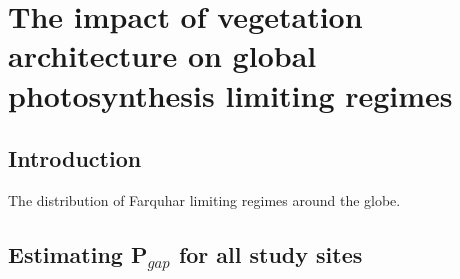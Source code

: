 \documentclass[a4paper,11pt]{report}
\title{}
\author{Renato Kerches Braghiere \\ This document was written in \LaTeX \\ Number of words: 12213}
\date{\today}
\begin{document}
\maketitle
\setcounter{chapter}{5} %

\chapter{The impact of vegetation architecture on global photosynthesis limiting regimes}

\section{Introduction}\label{introduction}

The distribution of Farquhar limiting regimes around the globe.

\section{Estimating P$_{gap}$ for all study sites}\label{section:hemiphotos}
\end{document}
